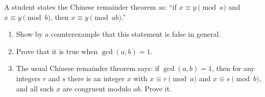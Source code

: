 A student states the Chinese remainder theorem as: ``if $x\equiv y\pmod a$ and $x\equiv y\pmod b$, then $x\equiv y\pmod{ab}$.''
\begin{enumerate}
\item[(a)] Show by a counterexample that this statement is false in general.
\item[(b)] Prove that it is true when $\gcd(a,b)=1$.
\item[(c)] The usual Chinese remainder theorem says: if $\gcd(a,b)=1$, then for any integers $r$ and $s$ there is an integer $x$ with $x\equiv r\pmod a$ and $x\equiv s\pmod b$, and all such $x$ are congruent modulo $ab$. Prove it.
\end{enumerate}

